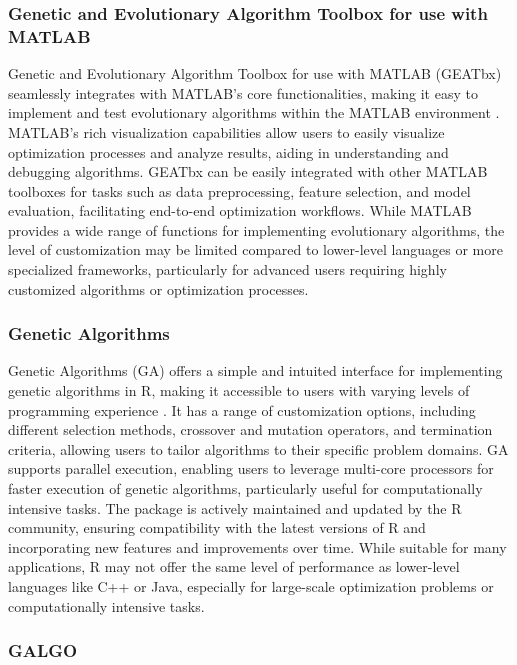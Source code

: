 \documentclass[12pt]{report}
\begin{document}
\subsubsection{Genetic and Evolutionary Algorithm Toolbox for use with MATLAB}
Genetic and Evolutionary Algorithm Toolbox for use with MATLAB (GEATbx) seamlessly integrates with MATLAB's core functionalities, making it easy to implement and test evolutionary algorithms within the MATLAB environment \cite{pohlheim1994geatbx}. MATLAB's rich visualization capabilities allow users to easily visualize optimization processes and analyze results, aiding in understanding and debugging algorithms. GEATbx can be easily integrated with other MATLAB toolboxes for tasks such as data preprocessing, feature selection, and model evaluation, facilitating end-to-end optimization workflows. While MATLAB provides a wide range of functions for implementing evolutionary algorithms, the level of customization may be limited compared to lower-level languages or more specialized frameworks, particularly for advanced users requiring highly customized algorithms or optimization processes.
 
 
\subsubsection{Genetic Algorithms}
Genetic Algorithms (GA) offers a simple and intuited interface for implementing genetic algorithms in R, making it accessible to users with varying levels of programming experience \cite{GA1, GA2}. It has a range of customization options, including different selection methods, crossover and mutation operators, and termination criteria, allowing users to tailor algorithms to their specific problem domains. GA supports parallel execution, enabling users to leverage multi-core processors for faster execution of genetic algorithms, particularly useful for computationally intensive tasks. The package is actively maintained and updated by the R community, ensuring compatibility with the latest versions of R and incorporating new features and improvements over time. While suitable for many applications, R may not offer the same level of performance as lower-level languages like C++ or Java, especially for large-scale optimization problems or computationally intensive tasks.

\subsubsection{GALGO}
\end{document}
